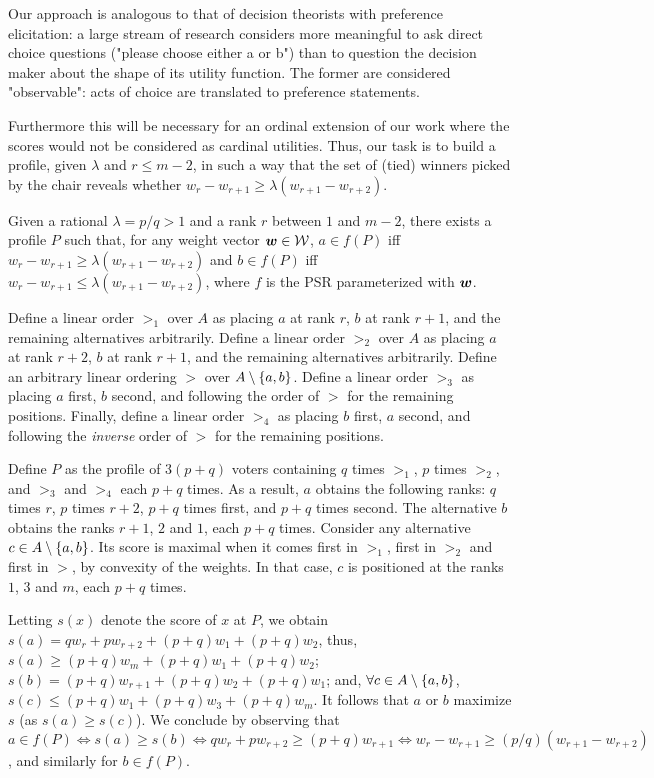 \documentclass{article}
\begin{document}
Our approach is analogous to that of decision theorists with preference elicitation: a large stream of research considers more meaningful to ask direct choice questions ("please choose either a or b") than to question the decision maker about the shape of its utility function. The former are considered "observable": acts of choice are translated to preference statements.

Furthermore this will be necessary for an ordinal extension of our work where the scores would not be considered as cardinal utilities.
Thus, our task is to build a profile, given $\lambda$ and $r ≤ m-2$, in such a way that the set of (tied) winners picked by the chair reveals whether $w_{r} - w_{r+1} \geq \lambda (w_{r+1} - w_{r+2})$.
\begin{proposition}
	Given a rational $\lambda = p/q > 1$ and a rank $r$ between $1$ and $m - 2$, there exists a profile $P$ such that, for any weight vector $\bm{w} \in \mathcal{W}$, $a \in f(P)$ iff $w_{r} - w_{r+1} ≥ \lambda (w_{r+1} - w_{r+2})$ and $b \in f(P)$ iff $w_{r} - w_{r+1} ≤ \lambda (w_{r+1} - w_{r+2})$, where $f$ is the PSR parameterized with $\bm{w}$.
\end{proposition}
\begin{proof*}
	Define a linear order $>_1$ over $A$ as placing $a$ at rank $r$, $b$ at rank $r + 1$, and the remaining alternatives arbitrarily. 
	Define a linear order $>_2$ over $A$ as placing $a$ at rank $r + 2$, $b$ at rank $r + 1$, and the remaining alternatives arbitrarily.
	Define an arbitrary linear ordering $>$ over $A \setminus \{a, b\}$. 
	Define a linear order $>_3$ as placing $a$ first, $b$ second, and following the order of $>$ for the remaining positions.
	Finally, define a linear order $>_4$ as placing $b$ first, $a$ second, and following the \emph{inverse} order of $>$ for the remaining positions.
	
	Define $P$ as the profile of $3 (p + q)$ voters containing $q$ times $>_1$, $p$ times $>_2$, and $>_3$ and $>_4$ each $p + q$ times.
	As a result, $a$ obtains the following ranks: $q$ times $r$, $p$ times $r + 2$, $p + q$ times first, and $p + q$ times second. The alternative $b$ obtains the ranks $r + 1$, $2$ and $1$, each $p + q$ times. Consider any alternative $c \in A \setminus \{a, b\}$. Its score is maximal when it comes first in $>_1$, first in $>_2$ and first in $>$, by convexity of the weights. In that case, $c$ is positioned at the ranks $1$, $3$ and $m$, each $p + q$ times. 
	
	Letting $s(x)$ denote the score of $x$ at $P$, we obtain $s(a) = q w_r + p w_{r + 2} + (p + q) w_1 + (p + q) w_2$, thus, $s(a) ≥ (p + q) w_m + (p + q) w_1 + (p + q) w_2$; $s(b) = (p + q) w_{r + 1} + (p + q) w_2 + (p + q) w_1$; and, $\forall c \in A \setminus \{a, b\}$, 
	$s(c) ≤ (p + q) w_1 + (p + q) w_3 + (p + q) w_m$. It follows that $a$ or $b$ maximize $s$ (as $s(a) ≥ s(c)$). We conclude by observing that $a \in f(P) ⇔ s(a) ≥ s(b) ⇔ q w_r + p w_{r + 2} ≥ (p + q) w_{r + 1} ⇔ w_r - w_{r + 1} ≥ (p / q) (w_{r + 1} - w_{r + 2})$, and similarly for $b \in f(P)$.
\end{proof*}
\end{document}
